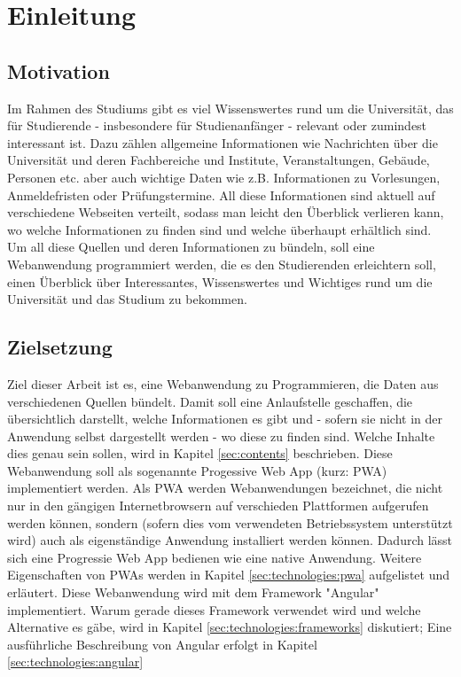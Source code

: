 %
\chapter{Einleitung}
\label{sec:motivation}
\section{Motivation}


Im Rahmen des Studiums gibt es viel Wissenswertes rund um die Universität, das für Studierende - insbesondere für Studienanfänger - relevant oder zumindest interessant ist. Dazu zählen allgemeine Informationen wie Nachrichten über die Universität und deren Fachbereiche und Institute, Veranstaltungen, Gebäude, Personen etc. aber auch wichtige Daten wie z.B. Informationen zu Vorlesungen, Anmeldefristen oder Prüfungstermine. All diese Informationen sind aktuell auf verschiedene Webseiten verteilt, sodass man leicht den Überblick verlieren kann, wo welche Informationen zu finden sind und welche überhaupt erhältlich sind.
Um all diese Quellen und deren Informationen zu bündeln, soll eine Webanwendung programmiert werden, die es den Studierenden erleichtern soll, einen Überblick über Interessantes, Wissenswertes und Wichtiges rund um die Universität und das Studium zu bekommen.

\section{Zielsetzung}
\label{sec:intro:aim}

Ziel dieser Arbeit ist es, eine Webanwendung zu Programmieren, die Daten aus verschiedenen Quellen bündelt. Damit soll eine Anlaufstelle geschaffen, die übersichtlich darstellt, welche Informationen es gibt und - sofern sie nicht in der Anwendung selbst dargestellt werden - wo diese zu finden sind. Welche Inhalte dies genau sein sollen, wird in Kapitel \ref{sec:contents} beschrieben.
Diese Webanwendung soll als sogenannte Progessive Web App (kurz: PWA) implementiert werden. Als PWA werden Webanwendungen bezeichnet, die nicht nur in den gängigen Internetbrowsern auf verschieden Plattformen aufgerufen werden können, sondern (sofern dies vom verwendeten Betriebssystem unterstützt wird) auch als eigenständige Anwendung installiert werden können. Dadurch lässt sich eine Progressie Web App bedienen wie eine native Anwendung. Weitere Eigenschaften von PWAs werden in Kapitel \ref{sec:technologies:pwa} aufgelistet und erläutert.
Diese Webanwendung wird mit dem Framework "Angular" implementiert. Warum gerade dieses Framework verwendet wird und welche Alternative es gäbe, wird in Kapitel \ref{sec:technologies:frameworks} diskutiert; Eine ausführliche Beschreibung von Angular erfolgt in Kapitel \ref{sec:technologies:angular}

